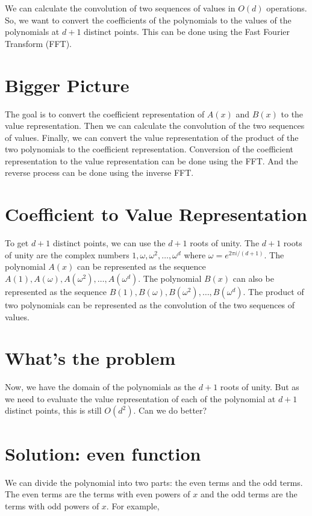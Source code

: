 \documentclass{report}
\begin{document}
We can calculate the convolution of two sequences of values in \(O(d)\) operations. So, we want to convert the coefficients of the polynomials to the values of the polynomials at \(d+1\) distinct points. This can be done using the Fast Fourier Transform (FFT).
\section{Bigger Picture} 
The goal is to convert the coefficient representation of $A(x) $ and $B(x)$ to the value representation. Then we can calculate the convolution of the two sequences of values. Finally, we can convert the value representation of the product of the two polynomials to the coefficient representation. \newline
Conversion of the coefficient representation to the value representation can be done using the FFT. And the reverse process can be done using the inverse FFT. \newline

\section{Coefficient to Value Representation}
To get \(d+1\) distinct points, we can use the \(d+1\) roots of unity. The \(d+1\) roots of unity are the complex numbers \(1, \omega, \omega^2, \ldots, \omega^d\) where \(\omega = e^{2\pi i/(d+1)}\). The polynomial \(A(x)\) can be represented as the sequence \(A(1), A(\omega), A(\omega^2), \ldots, A(\omega^d)\). The polynomial \(B(x)\) can also be represented as the sequence \(B(1), B(\omega), B(\omega^2), \ldots, B(\omega^d)\). The product of two polynomials can be represented as the convolution of the two sequences of values.


\section{What's the problem}
Now, we have the domain of the polynomials as the \(d+1\) roots of unity. But as we need to evaluate the value representation of each of the polynomial at \(d+1\) distinct points, this is still \(O(d^2)\). Can we do better? 

\section{Solution: even function}
We can divide the polynomial into two parts: the even terms and the odd terms. The even terms are the terms with even powers of \(x\) and the odd terms are the terms with odd powers of \(x\). For example, 
\end{document}
